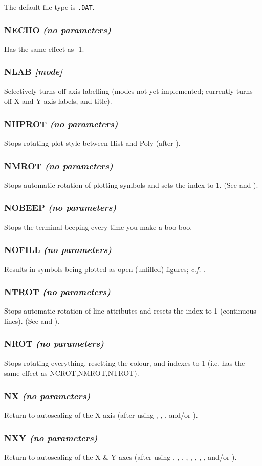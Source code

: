 \documentclass[twoside,11pt,noabs,nolof]{starlink}
\providecommand{\dipcom}[3]{\subsubsection*{\label{COM:#1}\textbf{#1} \emph{#2}}}
\begin{document}
The default file type is {\texttt{.DAT}}.

\dipcom{NECHO}{(no parameters)}{Stops the echoing of commands read from a command file}
Has the same effect as   -1.

\dipcom{NLAB}{[mode]}{Turns off axis labelling}
Selectively turns off axis labelling (modes not yet implemented;
  currently turns off X and Y axis labels, and title).

\dipcom{NHPROT}{(no parameters)}{Stops rotating plots styles between {\texttt{HIST}} and {\texttt{POLY}}}
Stops rotating plot style between Hist and Poly (after ).

\dipcom{NMROT}{(no parameters)}{Stops automatic rotation of {\texttt{MARK}} plotting symbols}
Stops automatic rotation of plotting symbols and sets the   index to 1.
(See   and ).

\dipcom{NOBEEP}{(no parameters)}{Stops the terminal beeping after every error}
Stops the terminal beeping every time you make a boo-boo.

\dipcom{NOFILL}{(no parameters)}{Causes {\texttt{MARK}} symbols to be plotted open (unfilled)}
Results in   symbols being plotted as open (unfilled) figures;
\textit{c.f.} .

\dipcom{NTROT}{(no parameters)}{Stops automatic rotation of line attributes}
Stops automatic rotation of line attributes and resets the   index
to 1 (continuous lines). (See   and ).

\dipcom{NROT}{(no parameters)}{Stops rotating everything}
Stops rotating everything, resetting the colour,   and 
indexes to 1 (i.e. has the same effect as NCROT,NMROT,NTROT).

\dipcom{NX}{(no parameters)}{Returns to auto-scaling of the X axis}
Return to autoscaling of the X axis (after using ,  ,  ,  
and/or ).

\dipcom{NXY}{(no parameters)}{Returns to auto-scaling of the X and Y axis}
Return to autoscaling of the X \& Y axes (after using ,  ,  ,
,  ,  ,  ,  ,  and/or ).
\end{document}
